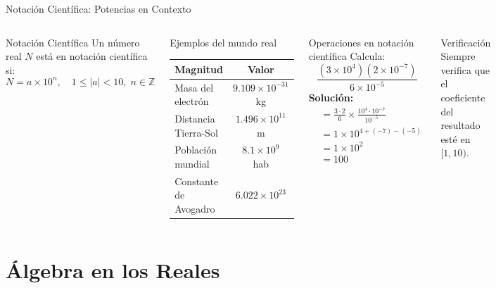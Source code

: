 \documentclass[12pt, aspectratio=169]{beamer}
\begin{document}
\begin{frame}{Notación Científica: Potencias en Contexto}
  \begin{columns}[T]
    \begin{definicion}{Notación Científica}
      Un número real $N$ está en notación científica si:
      \[
        N = a \times 10^n, \quad 1 \leq |a| < 10,\; n \in \mathbb{Z}
      \]
    \end{definicion}
    \vspace{6pt}
    \begin{block}{Ejemplos del mundo real}
      \small
      \renewcommand{\arraystretch}{1.3}
      \begin{tabular}{lc}
        \toprule
        Magnitud & Valor \\
        \midrule
        Masa del electrón & $9.109 \times 10^{-31}$ kg \\
        Distancia Tierra-Sol & $1.496 \times 10^{11}$ m \\
        Población mundial & $8.1 \times 10^{9}$ hab \\
        Constante de Avogadro & $6.022 \times 10^{23}$ \\
        \bottomrule
      \end{tabular}
    \end{block}

    \begin{ejercicio}{Operaciones en notación científica}
      \small Calcula:
      \[
        \frac{(3 \times 10^4)(2 \times 10^{-7})}{6 \times 10^{-5}}
      \]
      \textbf{Solución:}
      \begin{align*}
        &= \frac{3 \cdot 2}{6} \times \frac{10^{4} \cdot 10^{-7}}{10^{-5}}\\[4pt]
        &= 1 \times 10^{4+(-7)-(-5)}\\[4pt]
        &= 1 \times 10^{2}\\[4pt]
        &= \boxed{100}
      \end{align*}
    \end{ejercicio}
    \begin{alerta_box}{Verificación}
      Siempre verifica que el coeficiente del resultado esté en $[1,10)$.
    \end{alerta_box}
  \end{columns}
\end{frame}

\section{Álgebra en los Reales}
\end{document}
